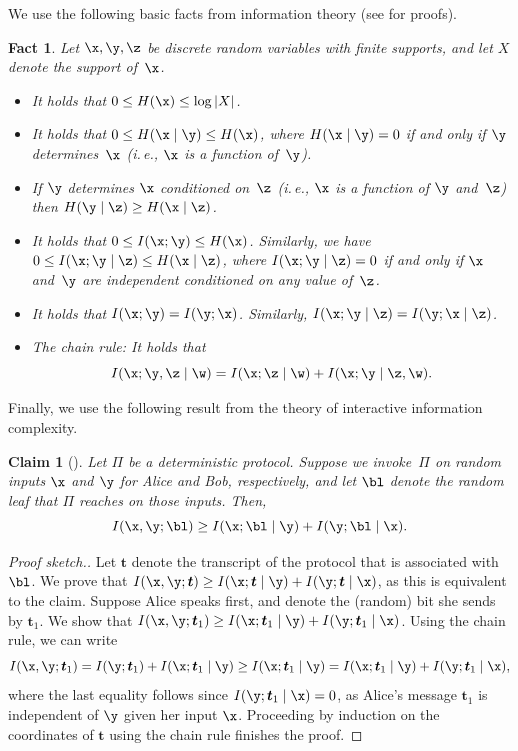 \documentclass[11pt]{article}
\numberwithin{equation}{section}
\newtheorem{claim}[theorem]{Claim}
\newtheorem{fact}[theorem]{Fact}
\theoremstyle{definition}
\theoremstyle{plain}
\newcommand{\ie}{i.\,e.}
\theoremstyle{definition}\newtheorem{notation}[theorem]{Notation}\theoremstyle{plain}
\begin{document}
We use the following basic facts from information theory (see \cite{CT91}
for proofs). 
\begin{fact}
\label{fact:information-properties}Let $\x,\y,\z$ be discrete random
variables with finite supports, and let $X$ denote the support of~$\x$. 
\begin{itemize}
\item It holds that $0\le H(\x)\le\log\left|X\right|$. 
\item It holds that $0\le H(\x\mid\y)\le H(\x)$, where $H(\x\mid\y)=0$
if and only if $\y$ determines~$\x$ (\ie, $\x$ is a function
of~$\y$). 
\item If $\y$ determines $\x$ conditioned on~$\z$ (\ie, $\x$ is a
function of $\y$ and~$\z$) then $H(\y\mid\z)\ge H(\x\mid\z)$. 
\item It holds that $0\le I(\x;\y)\le H(\x)$. Similarly, we have
$0\le I(\x;\y\mid\z)\le H(\x\mid\z)$, where $I(\x;\y\mid\z)=0$ if
and only if $\x$ and~$\y$ are independent conditioned on any value
of~$\z$. 
\item It holds that $I(\x;\y)=I(\y;\x)$. Similarly, $I(\x;\y\mid\z)=I(\y;\x\mid\z)$. 
\item \emph{The chain rule:} It holds that 
\[
I(\x;\y,\z\mid\w)=I(\x;\z\mid\w)+I(\x;\y\mid\z,\w).
\]
\end{itemize}
\end{fact}

Finally, we use the following result from the theory of interactive
information complexity. 
\begin{claim}[{{\cite[Fact 4.15]{BBCR13}}}]
\label{claim:internal-vs-external-information}Let $\Pi$ be a deterministic
protocol. Suppose we invoke~$\Pi$ on random inputs $\x$ and $\y$
for Alice and Bob, respectively, and let $\bl$ denote the random
leaf that $\Pi$ reaches on those inputs. Then, 
\[
I(\x,\y;\bl)\ge I(\x;\bl\mid\y)+I(\y;\bl\mid\x).
\]
\end{claim}

\begin{proof}[Proof sketch.]
Let $\boldsymbol{t}$ denote the transcript of the protocol that
is associated with~$\bl$. We prove that $I(\x,\y;\boldsymbol{t})\ge I(\x;\boldsymbol{t}\mid\y)+I(\y;\boldsymbol{t}\mid\x)$,
as this is equivalent to the claim. Suppose Alice speaks first, and
denote the (random) bit she sends by $\boldsymbol{t}_{1}$. We show
that $I(\x,\y;\boldsymbol{t}_{1})\ge I(\x;\boldsymbol{t}_{1}\mid\y)+I(\y;\boldsymbol{t}_{1}\mid\x)$.
Using the chain rule, we can write 
\[
I(\x,\y;\boldsymbol{t}_{1})=I(\y;\boldsymbol{t}_{1})+I(\x;\boldsymbol{t}_{1}\mid\y)\geq I(\x;\boldsymbol{t}_{1}\mid\y)=I(\x;\boldsymbol{t}_{1}\mid\y)+I(\y;\boldsymbol{t}_{1}\mid\x),
\]
where the last equality follows since $I(\y;\boldsymbol{t}_{1}\mid\x)=0$,
as Alice's message $\boldsymbol{t}_{1}$ is independent of $\y$ given
her input $\x$. Proceeding by induction on the coordinates of $\boldsymbol{t}$
using the chain rule finishes the proof. 
\end{proof}
\end{document}
